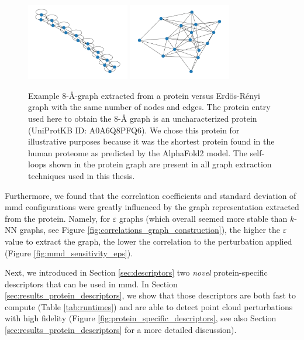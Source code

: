 \begin{figure}
  \centering
  \includegraphics[width=0.4\textwidth]{./figures/results/8_a_graph.pdf}
  \includegraphics[width=0.4\textwidth]{./figures/results/er_graph_8_a_params.pdf}
  \caption[Example 8-\si{\angstrom}-graph vs Erd\"os-Rényi graph with the same
number of nodes and edges.]{Example 8-\si{\angstrom}-graph extracted from a
protein versus Erd\"os-Rényi graph with the same number of nodes and edges. The
protein entry used here to obtain the 8-\si{\angstrom} graph is an
uncharacterized protein (UniProtKB ID: A0A6Q8PFQ6). We chose this protein for
illustrative purposes because it was the shortest protein found in the human
proteome as predicted by the AlphaFold2 model. The self-loops shown in the
protein graph are present in all graph extraction techniques used in this
thesis.}
  \label{fig:er_comparison_8a_graph}
\end{figure}

Furthermore, we found that the correlation coefficients and standard deviation
of \gls{mmd} configurations were greatly influenced by the graph
representation extracted from the protein. Namely, for $\varepsilon$ graphs
(which overall seemed more stable than $k$-NN graphs, see Figure
\ref{fig:correlations_graph_construction}), the higher the $\varepsilon$ value
to extract the graph, the lower the correlation to the perturbation applied
(Figure \ref{fig:mmd_sensitivity_eps}).

Next, we introduced in Section \ref{sec:descriptors} two \emph{novel}
protein-specific descriptors that can be used in \gls{mmd}. In Section
\ref{sec:results_protein_descriptors}, we show that those descriptors are both
fast to compute (Table \ref{tab:runtimes}) and are able to detect point cloud
perturbations with high fidelity (Figure \ref{fig:protein_specific_descriptors},
see also Section \ref{sec:results_protein_descriptors} for a more detailed
discussion).


